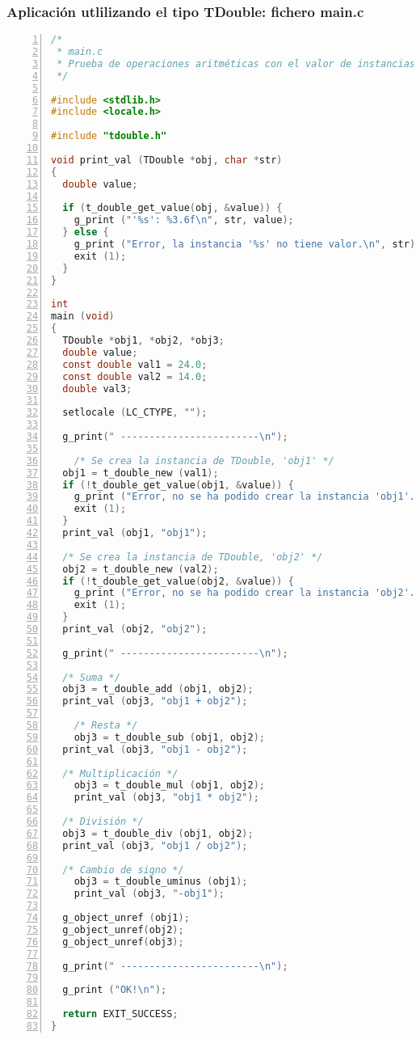 \subsubsection{Aplicación utlilizando el tipo \textsf{TDouble}: fichero \textsf{main.c}}

\begin{lstlisting}[language=C, numbers=left]
/*
 * main.c
 * Prueba de operaciones aritméticas con el valor de instancias TDouble.
 */

#include <stdlib.h>
#include <locale.h>

#include "tdouble.h"

void print_val (TDouble *obj, char *str)
{
  double value;
  
  if (t_double_get_value(obj, &value)) {
    g_print ("'%s': %3.6f\n", str, value);
  } else {
    g_print ("Error, la instancia '%s' no tiene valor.\n", str);
    exit (1);
  }
}

int
main (void)
{
  TDouble *obj1, *obj2, *obj3;
  double value;
  const double val1 = 24.0;
  const double val2 = 14.0;
  double val3;

  setlocale (LC_CTYPE, "");

  g_print(" ------------------------\n");
  
    /* Se crea la instancia de TDouble, 'obj1' */
  obj1 = t_double_new (val1);
  if (!t_double_get_value(obj1, &value)) {
    g_print ("Error, no se ha podido crear la instancia 'obj1'.\n");
    exit (1);
  }
  print_val (obj1, "obj1");
  
  /* Se crea la instancia de TDouble, 'obj2' */
  obj2 = t_double_new (val2);
  if (!t_double_get_value(obj2, &value)) {
    g_print ("Error, no se ha podido crear la instancia 'obj2'.\n");
    exit (1);
  }
  print_val (obj2, "obj2");

  g_print(" ------------------------\n");
    
  /* Suma */
  obj3 = t_double_add (obj1, obj2);
  print_val (obj3, "obj1 + obj2");

    /* Resta */
    obj3 = t_double_sub (obj1, obj2);
  print_val (obj3, "obj1 - obj2");

  /* Multiplicación */
    obj3 = t_double_mul (obj1, obj2);
    print_val (obj3, "obj1 * obj2");

  /* División */
  obj3 = t_double_div (obj1, obj2);
  print_val (obj3, "obj1 / obj2");

  /* Cambio de signo */
    obj3 = t_double_uminus (obj1);
    print_val (obj3, "-obj1");    

  g_object_unref (obj1);
  g_object_unref(obj2);
  g_object_unref(obj3);

  g_print(" ------------------------\n");
    
  g_print ("OK!\n");

  return EXIT_SUCCESS;
}\end{lstlisting}

  

